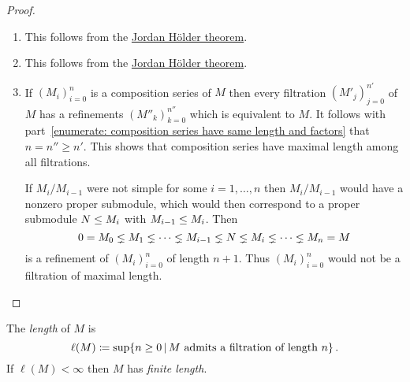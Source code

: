 \begin{proof}
  \leavevmode
  \begin{enumerate}
    \item
      This follows from the \hyperref[theorem: jordan hoelder theorem]{Jordan Hölder theorem}.
    \item
      This follows from the \hyperref[theorem: jordan hoelder theorem]{Jordan Hölder theorem}.
    \item
      If $(M_i)_{i=0}^n$ is a composition series of $M$ then every filtration $(M'_j)_{j=0}^{n'}$ of $M$ has a refinements $(M''_k)_{k=0}^{n''}$ which is equivalent to $M$.
      It follows with part~\ref*{enumerate: composition series have same length and factors} that $n = n'' \geq n'$.
      This shows that composition series have maximal length among all filtrations.
      
      If $M_i/M_{i-1}$ were not simple for some $i = 1, \dotsc, n$ then $M_i/M_{i-1}$ would have a nonzero proper submodule, which would then correspond to a proper submodule $N \leq M_i$ with $M_{i-1} \leq M_i$.
      Then
      \[
                    0
        =           M_0
        \lneq  M_1
        \lneq  \dotsb
        \lneq  M_{i-1}
        \lneq  N
        \lneq  M_i
        \lneq  \dotsb
        \lneq  M_n
        =           M
      \]
      is a refinement of $(M_i)_{i=0}^n$ of length $n+1$.
      Thus $(M_i)_{i=0}^n$ would not be a filtration of maximal length.
    \qedhere
  \end{enumerate}
\end{proof}


\begin{definition}
  The \emph{length} of $M$ is
  \[
              \ell(M)
    \defined  \sup  \{
                n \geq 0
              \suchthat
                \text{$M$ admits a filtration of length $n$}
              \} \,.
  \]
  If $\ell(M) < \infty$ then $M$ has \emph{finite length}.
\end{definition}


% 
% 
% 
% 



